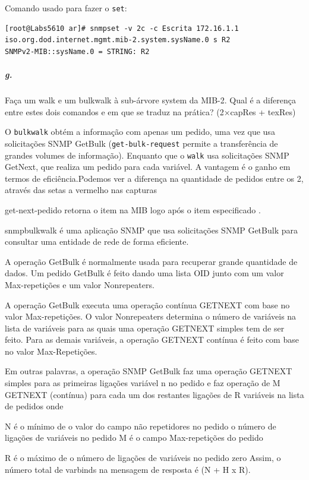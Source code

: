 Comando usado para fazer o \texttt{set}:
\begin{verbatim}
[root@Labs5610 ar]# snmpset -v 2c -c Escrita 172.16.1.1 iso.org.dod.internet.mgmt.mib-2.system.sysName.0 s R2
SNMPv2-MIB::sysName.0 = STRING: R2
\end{verbatim}


\subparagraph{g.}
Faça um walk e um bulkwalk à sub-árvore system da MIB-2. Qual é a diferença entre estes dois comandos e em que se traduz na prática? (2×capRes + texRes)

O \texttt{bulkwalk} obtém a informação com apenas um pedido, uma vez que usa solicitações SNMP GetBulk (\texttt{get-bulk-request} permite a transferência de grandes volumes de informação). Enquanto que o \texttt{walk} usa solicitações SNMP GetNext, que realiza um pedido para cada variável. A vantagem é o ganho em termos de eficiência.Podemos  ver  a  diferença  na  quantidade  de  pedidos  entre  os  2,  através  das  setas  a vermelho nas capturas

get-next-pedido retorna o item na MIB logo após o item especificado . 

snmpbulkwalk é uma aplicação SNMP que usa solicitações SNMP GetBulk para consultar uma entidade de rede de forma eficiente.


A operação GetBulk é normalmente usada para recuperar grande quantidade de dados. Um pedido GetBulk é feito dando uma lista OID junto com um valor Max-repetições e um valor Nonrepeaters.
 
A operação GetBulk executa uma operação contínua GETNEXT com base no valor Max-repetições. O valor Nonrepeaters determina o número de variáveis ​​na lista de variáveis ​​para as quais uma operação GETNEXT simples tem de ser feito. Para as demais variáveis, a operação GETNEXT contínua é feito com base no valor Max-Repetições.
 
Em outras palavras, a operação SNMP GetBulk faz uma operação GETNEXT simples para as primeiras ligações variável n no pedido e faz operação de M GETNEXT (contínua) para cada um dos restantes ligações de R variáveis ​​na lista de pedidos onde

N é o mínimo de
o valor do campo não repetidores no pedido
o número de ligações de variáveis ​​no pedido
M é o campo Max-repetições do pedido
 
R é o máximo de
o número de ligações de variáveis ​​no pedido
zero
Assim, o número total de varbinds na mensagem de resposta é (N + H x R).




